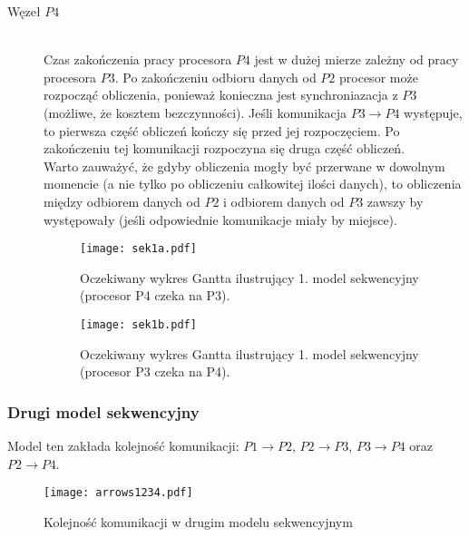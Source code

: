 \begin{description}
\item[Węzeł $P4$] \hfill \\

Czas zakończenia pracy procesora $P4$ jest w dużej mierze zależny od pracy procesora $P3$. Po zakończeniu odbioru danych od $P2$ procesor może rozpocząć obliczenia,
ponieważ konieczna jest synchroniazacja z $P3$ (możliwe, że kosztem bezczynności).
Jeśli komunikacja $P3 \to P4$ występuje, to pierwsza część obliczeń kończy się przed jej rozpoczęciem. Po zakończeniu tej komunikacji rozpoczyna się druga część obliczeń. \\

Warto zauważyć, że gdyby obliczenia mogły być przerwane w dowolnym momencie (a nie tylko po obliczeniu całkowitej ilości danych),
to obliczenia między odbiorem danych od $P2$ i odbiorem danych od $P3$ zawszy by występowały (jeśli odpowiednie komunikacje miały by miejsce).

\begin{figure}[!ht]
\centering
\texttt{[image: sek1a.pdf]}
\caption{Oczekiwany wykres Gantta ilustrujący 1. model sekwencyjny (procesor P4 czeka na P3).}
\label{fig:seq1a}
\end{figure}

\begin{figure}[!ht]
\centering
\texttt{[image: sek1b.pdf]}
\caption{Oczekiwany wykres Gantta ilustrujący 1. model sekwencyjny (procesor P3 czeka na P4).}
\label{fig:seq1b}
\end{figure}

\end{description}

\subsubsection{Drugi model sekwencyjny}

Model ten zakłada kolejność komunikacji: $P1 \to P2$, $P2 \to P3$, $P3 \to P4$ oraz $P2 \to P4$. \\

\begin{figure}[!ht]
\centering
\texttt{[image: arrows1234.pdf]}
\caption{Kolejność komunikacji w drugim modelu sekwencyjnym}
\label{fig:seq2}
\end{figure}

